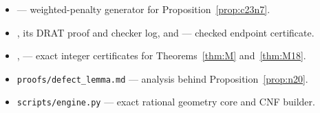 \documentclass[11pt]{article}
\theoremstyle{definition}
\begin{document}
\begin{itemize}
edge-use accounting.
\item {} --- weighted-penalty
generator for Proposition~\ref{prop:c23n7}.
\item {}, its DRAT proof and checker log, and
 --- checked endpoint certificate.
\item {},
 --- exact integer certificates for
Theorems~\ref{thm:M} and~\ref{thm:M18}.
\item \texttt{proofs/defect\_lemma.md} --- analysis behind
Proposition~\ref{prop:n20}.
\item \texttt{scripts/engine.py} --- exact rational geometry core and CNF
builder.
\end{itemize}
\end{document}
